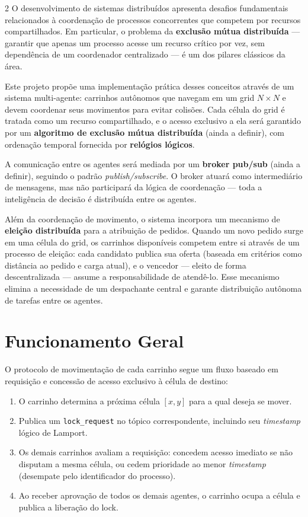 \documentclass[a4paper]{article}
\begin{document}
\begin{multicols}{2}
O desenvolvimento de sistemas distribu\'idos apresenta desafios fundamentais relacionados \`a coordena\c{c}\~ao de processos concorrentes que competem por recursos compartilhados. Em particular, o problema da \textbf{exclus\~ao m\'utua distribu\'ida} --- garantir que apenas um processo acesse um recurso cr\'itico por vez, sem depend\^encia de um coordenador centralizado --- \'e um dos pilares cl\'assicos da \'area.

Este projeto prop\~oe uma implementa\c{c}\~ao pr\'atica desses conceitos atrav\'es de um sistema multi-agente: carrinhos aut\^onomos que navegam em um grid $N \times N$ e devem coordenar seus movimentos para evitar colis\~oes. Cada c\'elula do grid \'e tratada como um recurso compartilhado, e o acesso exclusivo a ela ser\'a garantido por um \textbf{algoritmo de exclus\~ao m\'utua distribu\'ida} (ainda a definir), com ordena\c{c}\~ao temporal fornecida por \textbf{rel\'ogios l\'ogicos}.

A comunica\c{c}\~ao entre os agentes ser\'a mediada por um \textbf{broker pub/sub} (ainda a definir), seguindo o padr\~ao \textit{publish/subscribe}. O broker atuar\'a como intermedi\'ario de mensagens, mas n\~ao participar\'a da l\'ogica de coordena\c{c}\~ao --- toda a intelig\^encia de decis\~ao \'e distribu\'ida entre os agentes.

Al\'em da coordena\c{c}\~ao de movimento, o sistema incorpora um mecanismo de \textbf{elei\c{c}\~ao distribu\'ida} para a atribui\c{c}\~ao de pedidos. Quando um novo pedido surge em uma c\'elula do grid, os carrinhos dispon\'iveis competem entre si atrav\'es de um processo de elei\c{c}\~ao: cada candidato publica sua oferta (baseada em crit\'erios como dist\^ancia ao pedido e carga atual), e o vencedor --- eleito de forma descentralizada --- assume a responsabilidade de atend\^e-lo. Esse mecanismo elimina a necessidade de um despachante central e garante distribui\c{c}\~ao aut\^onoma de tarefas entre os agentes.

\section{Funcionamento Geral}

O protocolo de movimenta\c{c}\~ao de cada carrinho segue um fluxo baseado em requisi\c{c}\~ao e concess\~ao de acesso exclusivo \`a c\'elula de destino:

\begin{enumerate}
    \item O carrinho determina a pr\'oxima c\'elula $[x, y]$ para a qual deseja se mover.
    \item Publica um \texttt{lock\_request} no t\'opico correspondente, incluindo seu \textit{timestamp} l\'ogico de Lamport.
    \item Os demais carrinhos avaliam a requisi\c{c}\~ao: concedem acesso imediato se n\~ao disputam a mesma c\'elula, ou cedem prioridade ao menor \textit{timestamp} (desempate pelo identificador do processo).
    \item Ao receber aprova\c{c}\~ao de todos os demais agentes, o carrinho ocupa a c\'elula e publica a libera\c{c}\~ao do lock.
\end{enumerate}


\end{multicols}
\end{document}
